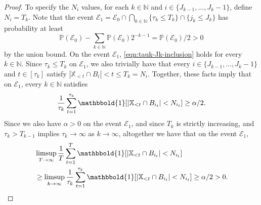 \documentclass[aos]{imsart}
\theoremstyle{plain}
\theoremstyle{remark}
\newcommand{\Xbb}{\mathbb{X}}
\newcommand{\1}{\mathbbm{1}}%
\newcommand{\Event}{\mathscr{E}}
\renewcommand{\P}{\mathbb P}
\newcommand{\nats}{\mathbb{N}}
\renewcommand{\limsup}{\mathop{\rm limsup}}
\newcommand{\ind}{\mathbbold{1}}
\begin{document}
\begin{proof}
To specify the $N_i$ values, for each $k \in \nats$ and 
$i \in \{J_{k-1},\ldots,J_{k}-1\}$, define $N_i = T_k$.
Note that the event 
$\Event_1 = \Event_0 \cap \bigcap\limits_{k \in \nats} \{ \tau_k \leq T_k \} \cap \{ j_k \leq J_k \}$ 
has probability at least 
\begin{equation*} 
\P(\Event_0) - \sum\limits_{k \in \nats} \P(\Event_0) 2^{-k-1} = \P(\Event_0)/2 > 0
\end{equation*}
by the union bound.
On the event $\Event_1$, \eqref{eqn:tauk-Jk-inclusion} holds 
for every $k \in \nats$. 
Since $\tau_k \leq T_k$ on $\Event_1$, 
we also trivially have that every $i \in \{J_{k-1},\ldots,J_{k}-1\}$ 
and $t \in [\tau_k]$ satisfy $| \Xbb_{< t} \cap B_i | < t \leq T_k = N_i$.
Together, these facts imply that on $\Event_1$, every $k \in \nats$ 
satisfies 
\begin{equation*}
\frac{1}{\tau_k} \sum_{t=1}^{\tau_k} \ind\!\left[ \left| \Xbb_{< t} \cap B_{i_t} \right| < N_{i_t}  \right] \geq \alpha/2.
\end{equation*}
Since we also have $\alpha > 0$ on the event $\Event_1$,
and since $T_k$ is strictly increasing, and $\tau_k > T_{k-1}$ 
implies $\tau_k \to \infty$ as $k \to \infty$, 
altogether we have that on the event $\Event_1$, 
\begin{align*}
& \limsup_{T \to \infty} \frac{1}{T} \sum_{t=1}^{T} \ind\!\left[ \left| \Xbb_{< t} \cap B_{i_t} \right| < N_{i_t} \right]
\\ & \geq \limsup_{k \to \infty} \frac{1}{\tau_k} \sum_{t=1}^{\tau_k} \ind\!\left[ \left| \Xbb_{< t} \cap B_{i_t} \right| < N_{i_t} \right] 
\geq \alpha/2 > 0.
\end{align*}


\end{proof}
\end{document}
